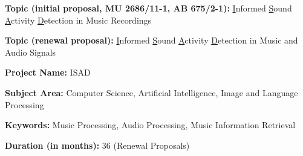 \documentclass[11pt,a4paper]{article}
\def\PN{\mathrm{ISAD}}
\theoremstyle{plain} \newtheorem{define}{Definition}[section]
\begin{document}
\vspace{-0.5cm}

{\bf Topic (initial proposal, MU 2686/11-1, AB 675/2-1):} \underline{I}nformed \underline{S}ound \underline{A}ctivity \underline{D}etection in Music Recordings 

{\bf Topic (renewal proposal):} \underline{I}nformed \underline{S}ound \underline{A}ctivity \underline{D}etection in Music and Audio Signals

{\bf Project Name:} $\PN$

%
%

{\bf Subject Area:} Computer Science, Artificial Intelligence, Image and Language Processing

{\bf Keywords:} Music Processing, Audio Processing, Music Information Retrieval

{\bf Duration (in months):} 36 (Renewal Proposals)


\end{document}
